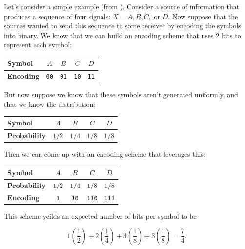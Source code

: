 \documentclass[a4paper,12pt]{article}
\begin{document}
Let's consider a simple example (from \cite{nielsen2010}). 
Consider a source of information that produces a sequence of four signals: $X=A, B, C,\text{ or } D$.
Now suppose that the sources wanted to send this sequence to some receiver by encoding the symbols into binary.
We know that we can build an encoding scheme that uses 2 bits to represent each symbol:

\begin{table}[H]
    \centering
    \begin{tabular}{@{} l c c c c @{}}
        \toprule
        \textbf{Symbol} & $A$ & $B$ & $C$ & $D$ \\
        \midrule
        \textbf{Encoding} & \texttt{00} & \texttt{01} & \texttt{10} & \texttt{11} \\
        \bottomrule
    \end{tabular}
\end{table}

But now suppose we know that these symbols aren't generated uniformly, and that we know the distribution:

\begin{table}[H]
    \centering
    \begin{tabular}{@{} l c c c c @{}}
        \toprule
        \textbf{Symbol} & $A$ & $B$ & $C$ & $D$ \\
        \midrule
        \textbf{Probability} & $1/2$ & $1/4$ & $1/8$ & $1/8$ \\
        \bottomrule
    \end{tabular}
\end{table}

Then we can come up with an encoding scheme that leverages this:

\begin{table}[H]
    \centering
    \begin{tabular}{@{} l c c c c @{}}
        \toprule
        \textbf{Symbol} & $A$ & $B$ & $C$ & $D$ \\
        \midrule
        \textbf{Probability} & $1/2$ & $1/4$ & $1/8$ & $1/8$ \\
        \textbf{Encoding} & \texttt{1} & \texttt{10} & \texttt{110} & \texttt{111} \\
        \bottomrule
    \end{tabular}
\end{table}

This scheme yeilds an expected number of bits per symbol to be

$$ 1\left(\frac{1}{2}\right) + 2\left(\frac{1}{4}\right) + 3\left(\frac{1}{8}\right) + 3\left(\frac{1}{8}\right) = \frac{7}{4}. $$
\end{document}

